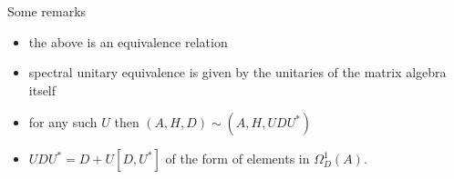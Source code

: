 Some remarks
\begin{itemize}
    \item the above is an equivalence relation
    \item spectral unitary equivalence is given by the unitaries of the
        matrix algebra itself
    \item for any such $U$ then $(A, H, D) \sim (A, H, UDU^*)$
    \item $UDU^* = D + U[D, U^*]$ of the form of elements in
        $\Omega _D^1 (A)$.
\end{itemize}

%
%
%
%

